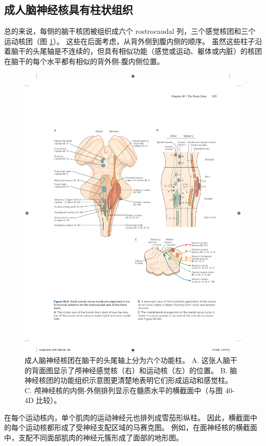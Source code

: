 \subsection{成人脑神经核具有柱状组织}
总的来说，每侧的脑干核团被组织成六个 rostrocaudal 列，三个感觉核团和三个运动核团（图 \ref{fig:40_6}）。 
这些在后面考虑，从背外侧到腹内侧的顺序。 
虽然这些柱子沿着脑干的头尾轴是不连续的，但具有相似功能（感觉或运动、躯体或内脏）的核团在脑干的每个水平都有相似的背外侧-腹内侧位置。

\begin{figure}[htbp]
	\centering
	\includegraphics[width=0.95\linewidth]{chap40/fig_40_6}
	\caption{成人脑神经核团在脑干的头尾轴上分为六个功能柱。 A. 这张人脑干的背面图显示了颅神经感觉核（右）和运动核（左）的位置。 B. 脑神经核团的功能组织示意图更清楚地表明它们形成运动和感觉柱。 C. 颅神经核的内侧-外侧排列显示在髓质水平的横截面中（与图 40-4D 比较）。}
	\label{fig:40_6}
\end{figure}

在每个运动核内，单个肌肉的运动神经元也排列成雪茄形纵柱。 因此，横截面中的每个运动核都形成了受神经支配区域的马赛克图。 例如，在面神经核的横截面中，支配不同面部肌肉的神经元簇形成了面部的地形图。

